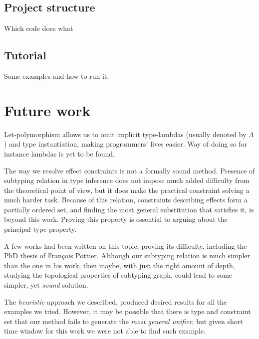 \documentclass[declaration,shortabstract]{iithesis}
\theoremstyle{definition} \newtheorem{definition}{Definition}[section]
\begin{document}
\section{Project structure}
Which code does what

\section{Tutorial}
Some examples and how to run it.

\chapter{Future work}
Let-polymorphism allows us to omit implicit type-lambdas
(usually denoted by $\Lambda$) and type instantiation, making programmers'
lives easier.
Way of doing so for instance lambdas is yet to be found.

The way we resolve effect constraints is not a formally sound method.
Presence of subtyping relation in type inference does not impose
much added difficulty from the theoretical point of view,
but it does make the practical constraint solving a much harder task.
Because of this relation, constraints describing effects
form a partially ordered set, and finding the most general
substitution that satisfies it, is beyond this work.
Proving this property is essential to arguing about the
principal type property.

A few works had been written on this topic, proving its difficulty,
including the PhD thesis of François Pottier\cite{francois}.
Although our subtyping relation is much simpler than the one in his work,
then maybe, with just the right amount of depth,
studying the topological properties of subtyping graph,
could lead to some simpler, yet \textit{sound} solution.

The \textit{heuristic} approach we described, produced desired results
for all the examples we tried.
However, it may be possible that there is type and constraint set that our method
fails to generate the \textit{most general unifier}, but given short time window for
this work we were not able to find such example.

\end{document}
